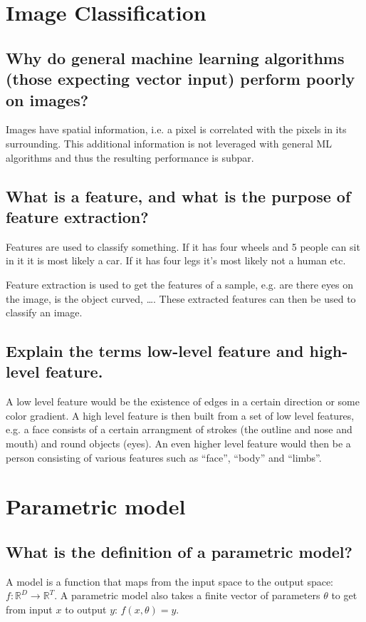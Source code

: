 \section{Image Classification}
\subsection{Why do general machine learning algorithms (those expecting vector input) perform poorly on images?}
Images have spatial information, i.e. a pixel is correlated with the pixels in its surrounding. This additional information is not leveraged with general ML algorithms and thus the resulting performance is subpar.
\subsection{What is a feature, and what is the purpose of feature extraction?}
Features are used to classify something. If it has four wheels and 5 people can sit in it it is most likely a car. If it has four legs it's most likely not a human etc.

Feature extraction is used to get the features of a sample, e.g. are there eyes on the image, is the object curved, \ldots. These extracted features can then be used to classify an image.
\subsection{Explain the terms low-level feature and high-level feature.}
A low level feature would be the existence of edges in a certain direction or some color gradient. A high level feature is then built from a set of low level features, e.g. a face consists of a certain arrangment of strokes (the outline and nose and mouth) and round objects (eyes). An even higher level feature would then be a person consisting of various features such as ``face'', ``body'' and ``limbs''. 
%
\section{Parametric model}
\subsection{What is the definition of a parametric model?}
A model is a function that maps from the input space to the output space: $f:\mathbb R^D \to \mathbb R^T$. A parametric model also takes a finite vector of parameters $\theta$ to get from input $x$ to output $y$: $f(x,\theta) = y$.

